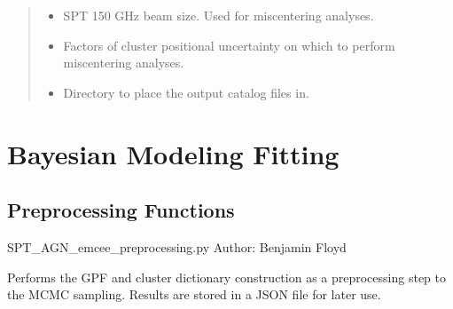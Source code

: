 \documentclass[letterpaper,12pt,english]{sphinxmanual}
\begin{document}
\begin{fulllineitems}
\begin{fulllineitems}
\begin{quote}
\begin{description}
\begin{itemize}
\item {} 
\sphinxAtStartPar
{} \textendash{} SPT 150 GHz beam size. Used for miscentering analyses.

\item {} 
\sphinxAtStartPar
{} \textendash{} Factors of cluster positional uncertainty on which to perform miscentering analyses.

\item {} 
\sphinxAtStartPar
{} \textendash{} Directory to place the output catalog files in.

\end{itemize}

\end{description}\end{quote}

\end{fulllineitems}


\end{fulllineitems}


\sphinxstepscope


\chapter{Bayesian Modeling Fitting}
\label{\detokenize{api/fitting:bayesian-modeling-fitting}}\label{\detokenize{api/fitting:fitting}}\label{\detokenize{api/fitting::doc}}

\section{Preprocessing Functions}
\label{\detokenize{api/fitting:module-SPTclIRAGN.SPT_AGN_emcee_preprocessing}}\label{\detokenize{api/fitting:preprocessing-functions}}
\sphinxAtStartPar
SPT\_AGN\_emcee\_preprocessing.py
Author: Benjamin Floyd

\sphinxAtStartPar
Performs the GPF and cluster dictionary construction as a preprocessing step to the MCMC sampling. Results are stored in
a JSON file for later use.
\end{document}
